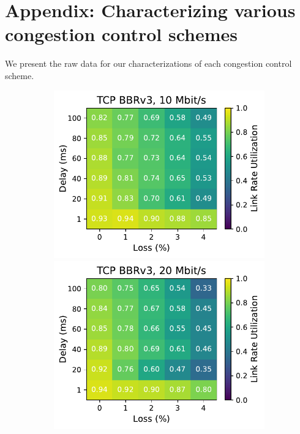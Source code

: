 \section{Appendix: Characterizing various congestion control schemes}
\label{sec:splitting:appendix}

We present the raw data for our characterizations of each
congestion control scheme.

\begin{figure}[ht]
    \centering
    \begin{subfigure}[b]{0.22\linewidth}
        \includegraphics[width=\linewidth,trim={0 0 2cm 0},clip]{splitting/figures/heatmaps/heatmap_tcp_bbr3_10mbps.pdf}
        \includegraphics[width=\linewidth,trim={0 0 2cm 0},clip]{splitting/figures/heatmaps/heatmap_tcp_bbr3_20mbps.pdf}

\end{subfigure}
\end{figure}
